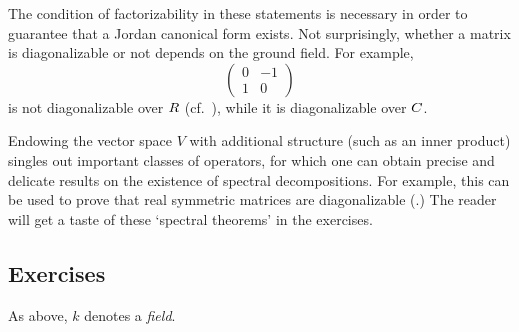 The condition of factorizability in these statements is necessary in
order to guarantee that a Jordan canonical form exists. Not
surprisingly, whether a matrix is diagonalizable or not depends on the
ground field. For example,
\[
  \begin{pmatrix} 0 & -1 \\ 1 & 0 \end{pmatrix}
\]
is not diagonalizable over $R$ (cf.\ ), while it is
diagonalizable over $C$.

Endowing the vector space $V$ with additional structure (such as an
inner product) singles out important classes of operators, for which
one can obtain precise and delicate results on the existence of
spectral decompositions. For example, this can be used to prove that
real symmetric matrices are diagonalizable
(.)
The reader will get a taste of these `spectral theorems' in the
exercises.

\subsection*{Exercises}

As above, $k$ denotes a \emph{field}.

